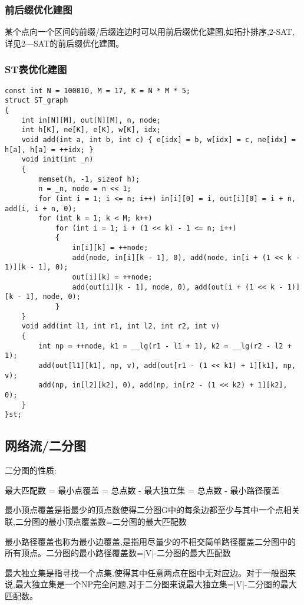 \documentclass[a4paper,fontset=none]{ctexart}
\begin{document}
\subsubsection{前后缀优化建图}

某个点向一个区间的前缀/后缀连边时可以用前后缀优化建图,如拓扑排序,2-SAT,详见2—SAT的前后缀优化建图。
\subsubsection{ST表优化建图}

\begin{verbatim}
const int N = 100010, M = 17, K = N * M * 5;
struct ST_graph
{
    int in[N][M], out[N][M], n, node;
    int h[K], ne[K], e[K], w[K], idx;
    void add(int a, int b, int c) { e[idx] = b, w[idx] = c, ne[idx] = h[a], h[a] = ++idx; }
    void init(int _n)
    {
        memset(h, -1, sizeof h);
        n = _n, node = n << 1;
        for (int i = 1; i <= n; i++) in[i][0] = i, out[i][0] = i + n, add(i, i + n, 0);
        for (int k = 1; k < M; k++)
            for (int i = 1; i + (1 << k) - 1 <= n; i++)
            {
                in[i][k] = ++node;
                add(node, in[i][k - 1], 0), add(node, in[i + (1 << k - 1)][k - 1], 0);
                out[i][k] = ++node;
                add(out[i][k - 1], node, 0), add(out[i + (1 << k - 1)][k - 1], node, 0);
            }
    }
    void add(int l1, int r1, int l2, int r2, int v)
    {
        int np = ++node, k1 = __lg(r1 - l1 + 1), k2 = __lg(r2 - l2 + 1);
        add(out[l1][k1], np, v), add(out[r1 - (1 << k1) + 1][k1], np, v);
        add(np, in[l2][k2], 0), add(np, in[r2 - (1 << k2) + 1][k2], 0);
    }
}st;
\end{verbatim}

\subsection{网络流/二分图}

二分图的性质:

最大匹配数 = 最小点覆盖 = 总点数 - 最大独立集 = 总点数 - 最小路径覆盖

最小顶点覆盖是指最少的顶点数使得二分图G中的每条边都至少与其中一个点相关联,二分图的最小顶点覆盖数=二分图的最大匹配数

最小路径覆盖也称为最小边覆盖,是指用尽量少的不相交简单路径覆盖二分图中的所有顶点。二分图的最小路径覆盖数=|V|-二分图的最大匹配数

最大独立集是指寻找一个点集,使得其中任意两点在图中无对应边。对于一般图来说,最大独立集是一个NP完全问题,对于二分图来说最大独立集=|V|-二分图的最大匹配数。
\end{document}
